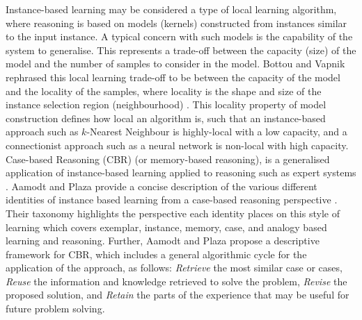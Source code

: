 Instance-based learning may be considered a type of local learning algorithm, where reasoning is based on models (kernels) constructed from instances similar to the input instance. A typical concern with such models is the capability of the system to generalise. This represents a trade-off between the capacity (size) of the model and the number of samples to consider in the model. Bottou and Vapnik rephrased this local learning trade-off to be between the capacity of the model and the locality of the samples, where locality is the shape and size of the instance selection region (neighbourhood) \cite{Bottou1992}. This locality property of model construction defines how local an algorithm is, such that an instance-based approach such as $k$-Nearest Neighbour is highly-local with a low capacity, and a connectionist approach such as a neural network is non-local with high capacity. Case-based Reasoning (CBR) (or memory-based reasoning), is a generalised application of instance-based learning applied to reasoning such as expert systems \cite{Aha1991}. Aamodt and Plaza provide a concise description of the various different identities of instance based learning from a case-based reasoning perspective \cite{Aamodt1994}. Their taxonomy highlights the perspective each identity places on this style of learning which covers exemplar, instance, memory, case, and analogy based learning and reasoning. Further, Aamodt and Plaza propose a descriptive framework for CBR, which includes a general algorithmic cycle for the application of the approach, as follows: \emph{Retrieve} the most similar case or cases, \emph{Reuse} the information and knowledge retrieved to solve the problem, \emph{Revise} the proposed solution, and \emph{Retain} the parts of the experience that may be useful for future problem solving.

